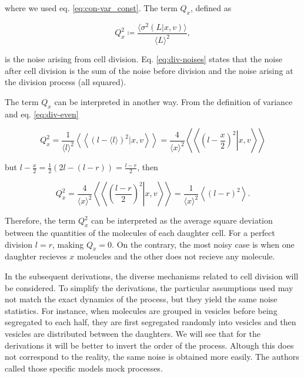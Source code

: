 where we used eq. \eqref{eq:con-var_const}. The term $Q_x$, defined as

\begin{equation}
  \label{eq:div-Q}
  Q_x^2 \coloneqq \frac{\langle\sigma^2(L|x,v)\rangle}{\langle L\rangle^2},
\end{equation}

is the noise arising from cell division. Eq. \eqref{eq:div-noises} states that the noise after cell division is the sum of the noise before division and the noise arising at the division process (all squared).

The term $Q_x$ can be interpreted in another way. From the definition of variance and eq. \eqref{eq:div-even}

\begin{equation*}
  Q_x^2 = \frac{1}{\langle l\rangle^2}\left\langle\left\langle\left(l-\langle l\rangle\right)^2|x,v\right\rangle\right\rangle = \frac{4}{\langle x\rangle^2}\left\langle\left\langle\left.\left(l-\frac{x}{2}\right)^2\right|x,v\right\rangle\right\rangle
\end{equation*}

but $l - \frac{x}{2} = \frac{1}{2}(2l-(l-r)) = \frac{l-r}{2}$, then

\begin{equation*}
   Q_x^2 = \frac{4}{\langle x\rangle^2}\left\langle\left\langle\left.\left(\frac{l-r}{2}\right)^2\right|x,v\right\rangle\right\rangle  = \frac{1}{\langle x\rangle^2}\left\langle\left(l-r\right)^2\right\rangle.
\end{equation*}

Therefore, the term $Q_x^2$ can be interpreted as the average square deviation between the quantities of the molecules of each daughter cell. For a perfect division $l=r$, making $Q_x=0$. On the contrary, the most noisy case is when one daughter recieves $x$ moleucles and the other does not recieve any molecule.

In the subsequent derivations, the diverse mechanisms related to cell division will be considered. To simplify the derivations, the particular assumptions used may not match the exact dynamics of the process, but they yield the same noise statistics. For instance, when molecules are grouped in vesicles before being segregated to each half, they are first segregated randomly into vesicles and then vesicles are distributed between the daughters. We will see that for the derivations it will be better to invert the order of the process. Altough this does not correspond to the reality, the same noise is obtained more easily. The authors called those specific models mock processes.

